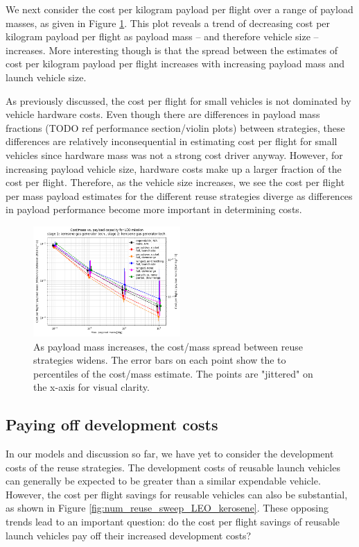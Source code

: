 \documentclass[conf]{new-aiaa}
\begin{document}
\begin{multicols}{2}
We next consider the cost per kilogram payload per flight over a range of payload masses, as given in Figure \ref{fig:m_payload_sweep_LEO_kerosene}. This plot reveals a trend of decreasing cost per kilogram payload per flight as payload mass -- and therefore vehicle size -- increases. More interesting though is that the spread between the estimates of cost per kilogram payload per flight increases with increasing payload mass and launch vehicle size. 

As previously discussed, the cost per flight for small vehicles is not dominated by vehicle hardware costs. Even though there are differences in payload mass fractions (TODO ref performance section/violin plots) between strategies, these differences are relatively inconsequential in estimating cost per flight for small vehicles since hardware mass was not a strong cost driver anyway. However, for increasing payload vehicle size, hardware costs make up a larger fraction of the cost per flight. Therefore, as the vehicle size increases, we see the cost per flight per mass payload estimates for the different reuse strategies diverge as differences in payload performance become more important in determining costs. 

\begin{figure}[H]
    \centering
    \includegraphics[width=0.5\textwidth]{../../lvreuse/analysis/combined/plots/m_payload_sweep_LEO_kerosene}
    \caption{\label{fig:m_payload_sweep_LEO_kerosene} As payload mass increases, the cost/mass spread between reuse strategies widens. The error bars on each point show the  to  percentiles of the cost/mass estimate. The points are "jittered" on the x-axis for visual clarity.}
\end{figure}

\subsection{Paying off development costs}

In our models and discussion so far, we have yet to consider the development costs of the reuse strategies. The development costs of reusable launch vehicles can generally be expected to be greater than a similar expendable vehicle. However, the cost per flight savings for reusable vehicles can also be substantial, as shown in Figure \ref{fig:num_reuse_sweep_LEO_kerosene}. These opposing trends lead to an important question: do the cost per flight savings of reusable launch vehicles pay off their increased development costs? 


\end{multicols}
\end{document}
